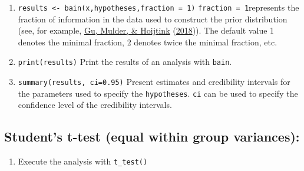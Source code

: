 \documentclass[
]{book}
\newenvironment{Shaded}{\begin{snugshade}}{\end{snugshade}}
\newcommand{\AttributeTok}[1]{\textcolor[rgb]{0.77,0.63,0.00}{#1}}
\newcommand{\CommentTok}[1]{\textcolor[rgb]{0.56,0.35,0.01}{\textit{#1}}}
\newcommand{\ConstantTok}[1]{\textcolor[rgb]{0.00,0.00,0.00}{#1}}
\newcommand{\DecValTok}[1]{\textcolor[rgb]{0.00,0.00,0.81}{#1}}
\newcommand{\FunctionTok}[1]{\textcolor[rgb]{0.00,0.00,0.00}{#1}}
\newcommand{\NormalTok}[1]{#1}
\newcommand{\OtherTok}[1]{\textcolor[rgb]{0.56,0.35,0.01}{#1}}
\newcommand{\SpecialCharTok}[1]{\textcolor[rgb]{0.00,0.00,0.00}{#1}}
\providecommand{\tightlist}{%
  \setlength{\itemsep}{0pt}\setlength{\parskip}{0pt}}
\begin{document}
\begin{enumerate}
\def\labelenumi{\arabic{enumi})}
\setcounter{enumi}{2}
\item
  \texttt{results\ \textless{}-\ bain(x,hypotheses,fraction\ =\ 1)}
  \texttt{fraction\ =\ 1}represents the fraction of information in the data used to construct the prior distribution (see, for example, \protect\hyperlink{ref-gu2018approximated}{Gu, Mulder, \& Hoijtink} (\protect\hyperlink{ref-gu2018approximated}{2018})). The default value 1 denotes the minimal fraction, 2 denotes twice the minimal fraction, etc.
\item
  \texttt{print(results)} Print the results of an analysis with
  \texttt{bain}.
\item
  \texttt{summary(results,\ ci=0.95)} Present estimates and credibility intervals for the parameters used to specify the \texttt{hypotheses}. \texttt{ci} can be used to specify the confidence level of the credibility intervals.
\end{enumerate}

\hypertarget{students-t-test-equal-within-group-variances}{%
\subsection{Student's t-test (equal within group variances):}\label{students-t-test-equal-within-group-variances}}

\begin{enumerate}
\def\labelenumi{\arabic{enumi})}
\tightlist
\item
  Execute the analysis with \texttt{t\_test()}
\end{enumerate}

\begin{Shaded}
\end{Shaded}
\end{document}
